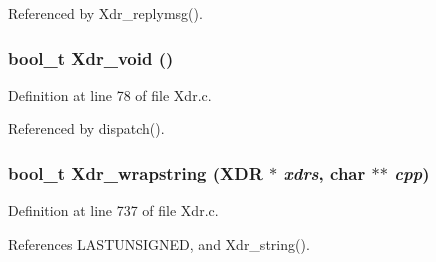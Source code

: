 Referenced by Xdr\_\-replymsg().
\subsubsection{\setlength{\rightskip}{0pt plus 5cm}bool\_\-t Xdr\_\-void ()}\label{Xdr_8c_a5}




Definition at line 78 of file Xdr.c.

Referenced by dispatch().
\subsubsection{\setlength{\rightskip}{0pt plus 5cm}bool\_\-t Xdr\_\-wrapstring (XDR $\ast$ {\em xdrs}, char $\ast$$\ast$ {\em cpp})}\label{Xdr_8c_a25}




Definition at line 737 of file Xdr.c.

References LASTUNSIGNED, and Xdr\_\-string().
